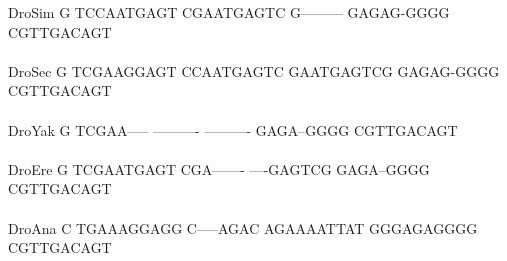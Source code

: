 \documentclass[11pt,twoside,reqno,a4paper]{article}
\begin{document}
{DroSim	G	TCCAATGAGT	CGAATGAGTC	G---------	GAGAG-GGGG	CGTTGACAGT	\\
\hspace*{7\charwidth}\hspace*{1\charwidth}\hspace*{1\charwidth}\hspace*{1\charwidth}\hspace*{1\charwidth}\hspace*{1\charwidth}\hspace*{1\charwidth}\\
DroSec	G	TCGAAGGAGT	CCAATGAGTC	GAATGAGTCG	GAGAG-GGGG	CGTTGACAGT	\\
\hspace*{7\charwidth}\hspace*{1\charwidth}\hspace*{1\charwidth}\hspace*{1\charwidth}\hspace*{1\charwidth}\hspace*{1\charwidth}\hspace*{1\charwidth}\\
DroYak	G	TCGAA-----	----------	----------	GAGA--GGGG	CGTTGACAGT	\\
\hspace*{7\charwidth}\hspace*{1\charwidth}\hspace*{1\charwidth}\hspace*{1\charwidth}\hspace*{1\charwidth}\hspace*{1\charwidth}\hspace*{1\charwidth}\\
DroEre	G	TCGAATGAGT	CGA-------	----GAGTCG	GAGA--GGGG	CGTTGACAGT	\\
\hspace*{7\charwidth}\hspace*{1\charwidth}\hspace*{1\charwidth}\hspace*{1\charwidth}\hspace*{1\charwidth}\hspace*{1\charwidth}\hspace*{1\charwidth}\\
DroAna	C	TGAAAGGAGG	C-----AGAC	AGAAAATTAT	GGGAGAGGGG	CGTTGACAGT	\\
\hspace*{7\charwidth}\hspace*{1\charwidth}\hspace*{1\charwidth}\hspace*{1\charwidth}\hspace*{1\charwidth}\hspace*{1\charwidth}\hspace*{1\charwidth}\\
}
\end{document}
